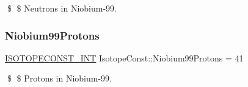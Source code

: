 \$ \$ Neutrons in Niobium-\/99. \mbox{\label{group___isotope_const-_niobium-_nb99_gac4a45e12d620bee9e26d98753522cc8e}} 
\subsubsection{\texorpdfstring{Niobium99\+Protons}{Niobium99Protons}}
{\footnotesize\ttfamily \mbox{\hyperlink{group___isotope_const-_macros_ga5f18360b3e99483a35c32d789e62621c}{I\+S\+O\+T\+O\+P\+E\+C\+O\+N\+S\+T\+\_\+\+I\+NT}} Isotope\+Const\+::\+Niobium99\+Protons = 41}

\$ \$ Protons in Niobium-\/99. 